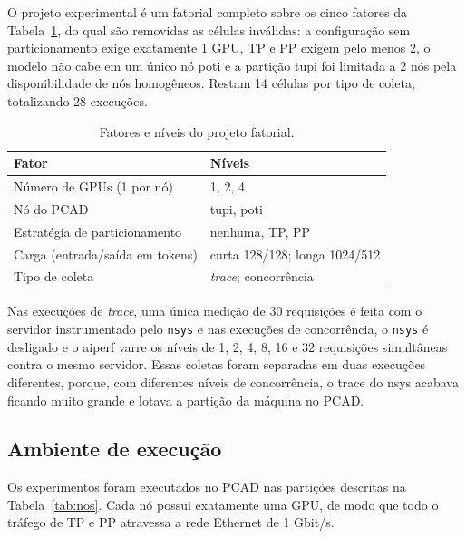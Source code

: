 \documentclass[manuscript,screen]{acmart}
\begin{document}
O projeto experimental é um fatorial completo sobre os cinco fatores da Tabela~\ref{tab:fatores}, do qual são removidas as células inválidas: a configuração sem particionamento exige exatamente 1 GPU, TP e PP exigem pelo menos 2, o modelo não cabe em um único nó poti e a partição tupi foi limitada a 2 nós pela disponibilidade de nós homogêneos. Restam 14 células por tipo de coleta, totalizando 28 execuções.

\begin{table}[h]
	\caption{Fatores e níveis do projeto fatorial.}
	\label{tab:fatores}
	\begin{tabular}{ll}
		\toprule
		Fator & Níveis \\
		\midrule
		Número de GPUs (1 por nó) & 1, 2, 4 \\
		Nó do PCAD & tupi, poti \\
		Estratégia de particionamento & nenhuma, TP, PP \\
		Carga (entrada/saída em tokens) & curta 128/128; longa 1024/512 \\
		Tipo de coleta & \textit{trace}; concorrência \\
		\bottomrule
	\end{tabular}
\end{table}


Nas execuções de \textit{trace}, uma única medição de 30 requisições é feita com o servidor instrumentado pelo \texttt{nsys} e nas execuções de concorrência, o \texttt{nsys} é desligado e o aiperf varre os níveis de 1, 2, 4, 8, 16 e 32 requisições simultâneas contra o mesmo servidor. Essas coletas foram separadas em duas execuções diferentes, porque, com diferentes níveis de concorrência, o trace do nsys acabava ficando muito grande e lotava a partição da máquina no PCAD.

\subsection{Ambiente de execução}

Os experimentos foram executados no PCAD nas partições descritas na Tabela~\ref{tab:nos}. Cada nó possui exatamente uma GPU, de modo que todo o tráfego de TP e PP atravessa a rede Ethernet de 1 Gbit/s.
\end{document}
